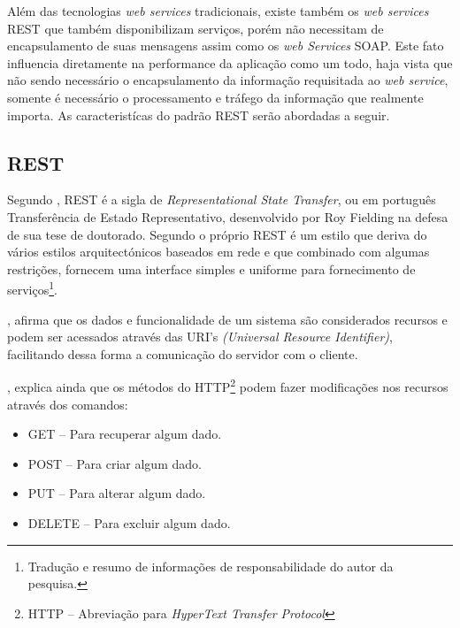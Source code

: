 	\par Além das tecnologias \textit{web services} tradicionais, existe também os
\textit{web services} REST que também disponibilizam serviços, porém não
necessitam de encapsulamento de suas mensagens assim como os \textit{web
Services} SOAP. Este fato influencia diretamente na performance da aplicação
como um todo, haja vista que não sendo necessário o encapsulamento da informação
requisitada ao \textit{web service}, somente é necessário o processamento e
tráfego da informação que realmente importa. As caracteristícas do padrão REST
serão abordadas a seguir.

	\subsection{REST}
	
	\par Segundo , REST é a sigla de
\textit{Representational State Transfer}, ou em português Transferência de
Estado Representativo, desenvolvido por Roy Fielding na defesa de sua tese de
doutorado. Segundo o próprio  REST é um estilo que
deriva do vários estilos arquitectónicos baseados em rede e  que combinado
com algumas restrições, fornecem uma interface simples e uniforme para
fornecimento de serviços\footnote{Tradução e resumo de informações de
responsabilidade do autor da pesquisa.}.
	
	\par {}, afirma que os dados e funcionalidade de um sistema
são considerados recursos e podem ser acessados através das URI's
\textit{(Universal Resource Identifier)}, facilitando dessa forma a comunicação
do servidor com o cliente.
	 	
	\par {}, explica ainda que os métodos do HTTP\footnote{
 HTTP – Abreviação para \textit{HyperText Transfer Protocol}} podem fazer
 modificações nos recursos através dos comandos:
	 
	 \begin{itemize}
	   \item GET – Para recuperar algum dado. 
	   \item POST – Para criar algum dado.
	   \item PUT – Para alterar algum dado. 
	   \item DELETE – Para excluir algum dado. 
	 \end{itemize}
	 
